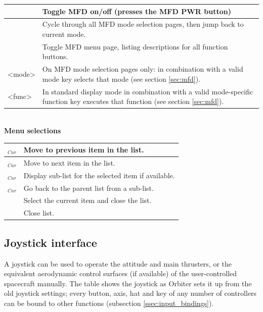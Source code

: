 \documentclass[Orbiter User Manual.tex]{subfiles}
\begin{document}
	\begin{longtable}{ |p{}|p{}| }
	\hline\rule{0pt}{2ex}
	\Shift\keystroke{Esc} & Toggle MFD on/off (presses the MFD PWR button)\\
	\hline\rule{0pt}{2ex}
	\Shift\keystroke{F1} & Cycle through all MFD mode selection pages, then jump back to current mode.\\
	\hline\rule{0pt}{2ex}
	\Shift\keystroke{'} & Toggle MFD menu page, listing descriptions for all function buttons.\\
	\hline\rule{0pt}{2ex}
	\Shift<mode> & On MFD mode selection pages only: \Shift in combination with a valid mode key selects that mode (see section \ref{sec:mfd}).\\
	\hline\rule{0pt}{2ex}
	\Shift<func> & In standard display mode \Shift in combination with a valid mode-specific function key executes that function (see section \ref{sec:mfd}).\\
	\hline
	\end{longtable}

\noindent
\\
\textbf{Menu selections}

	\begin{longtable}{ |p{}|p{}| }
	\hline\rule{0pt}{2ex}
	\UArrow$_{Cur}$ & Move to previous item in the list.\\
	\hline\rule{0pt}{2ex}
	\DArrow$_{Cur}$ & Move to next item in the list.\\
	\hline\rule{0pt}{2ex}
	\RArrow$_{Cur}$ & Display sub-list for the selected item if available.\\
	\hline\rule{0pt}{2ex}
	\LArrow$_{Cur}$ & Go back to the parent list from a sub-list.\\
	\hline\rule{0pt}{2ex}
	\Enter & Select the current item and close the list.\\
	\hline\rule{0pt}{2ex}
	\keystroke{Esc} & Close list.\\
	\hline
	\end{longtable}


\subsection{Joystick interface}
A joystick can be used to operate the attitude and main thrusters, or the equivalent aerodynamic control surfaces (if available) of the user-controlled spacecraft manually. The table shows the joystick as Orbiter sets it up from the old joystick settings; every button, axis, hat and key of any number of controllers can be bound to other functions (subsection \ref{ssec:input_bindings}).
\end{document}
